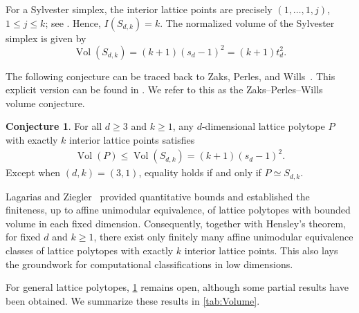 \documentclass[reqno, 11pt]{article}
\numberwithin{equation}{section}
\theoremstyle{definition}
\newtheorem{conjecture}[conjecture]{Conjecture}
\begin{document}
For a Sylvester simplex, the interior lattice points are precisely $(1,\ldots,1,j)$, $1\leq j\leq k$; see \cite[Proposition~2.9(d)]{CCJP2026}.
Hence, $I(S_{d,k})=k$. The normalized volume of the Sylvester simplex
is given by
\begin{equation}\label{intro:eq:model-volume}
 \operatorname{Vol}(S_{d,k})=(k+1)(s_d-1)^2=(k+1)t_d^2.
\end{equation}

The following conjecture can be traced back to Zaks, Perles, and
Wills~\cite{ZPW1982}. This explicit version can be found in
\cite[Conjecture~1.5]{BK2016}.
We refer to this as the Zaks--Perles--Wills volume conjecture.
\begin{conjecture}\label{ConjectureZPW}
For all $d\geq3$ and $k\geq1$, any $d$-dimensional lattice polytope $P$
with exactly $k$ interior lattice points satisfies
\begin{align*}
 \operatorname{Vol}(P)\leq\operatorname{Vol}(S_{d,k})
 =(k+1)(s_d-1)^2.
\end{align*}
Except when $(d,k)=(3,1)$, equality holds if and only if
$P\simeq S_{d,k}$.
\end{conjecture}

Lagarias and Ziegler~\cite{LZ91} provided quantitative bounds and
established the finiteness, up to affine unimodular equivalence, of
lattice polytopes with bounded volume in each fixed dimension.
Consequently, together with Hensley's theorem, for fixed $d$ and
$k\geq1$, there exist only finitely many affine unimodular equivalence
classes of lattice polytopes with exactly $k$ interior lattice points.
This also lays the groundwork for computational classifications in
low dimensions.

For general lattice polytopes, \cref{ConjectureZPW} remains open,
although some partial results have been obtained.
We summarize these results in \cref{tab:Volume}.
\end{document}
